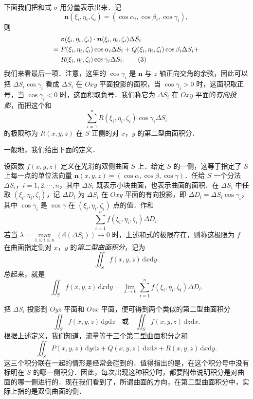 下面我们把和式 $\sigma$ 用分量表示出来．记
\[
\bm{n}(\xi_{i},\eta_{i},\zeta_{i})=\left(\cos\alpha_{i},\cos\beta_{i},\cos\gamma_{i}\right),
\]
则
\begin{align}
&\boldsymbol{v}(\xi_{i},\eta_{i},\zeta_{i})\cdot\boldsymbol{n}(\xi_{i},\eta_{i},\zeta_{i})\Delta S_{i}\notag\\
={}&P(\xi_{i},\eta_{i},\zeta_{i})\cos\alpha_{i}\Delta S_{i}+Q(\xi_{i},\eta_{i},\zeta_{i})\cos\beta_{i}\Delta S_{i}+\notag\\
&R(\xi_{i},\eta_{i},\zeta_{i})\cos\gamma_{i}\Delta S_{i}. \tag{3}\label{eq:21-2-3}
\end{align}
我们来看最后一项．注意，这里的 $\cos\gamma_{i}$ 是 $\bm{n}$ 与 $z$ 轴正向交角的余弦，因此可以把 $\Delta S_{i}\cos\gamma_{i}$ 看成 $\Delta S_{i}$ 在 $Oxy$ 平面投影的面积，当 $\cos\gamma_{i}>0$ 时，这面积取正号，当 $\cos\gamma_{i}<0$ 时，这面积取负号．我们称它为 $\Delta S_{i}$ 在 $Oxy$ 平面的\emph{有向投影}，而把这个和
\[
\sum_{i=1}^{n}R(\xi_{i},\eta_{i},\zeta_{i})\cos\gamma_{i}\Delta S_{i}
\]
的极限称为 $R(x,y,z)$ 在 $S$ 正侧的对 $x$，$y$ 的第二型曲面积分．

一般地，我们给出下面的定义．

\begin{definition}\label{def:21-4}
设函数 $f(x,y,z)$ 定义在光滑的双侧曲面 $S$ 上．给定 $S$ 的一侧，这等于指定了 $S$ 上每一点的单位法向量 $\bm{n}(x,y,z)=(\cos\alpha,\cos\beta,\cos\gamma)$．任给 $S$ 一个分法 $\Delta S_{i}$，$i=1,2,\cdots,n$，其中 $\Delta S_{i}$ 既表示小块曲面，也表示曲面的面积．在 $\Delta S_{i}$ 中任取 $(\xi_{i},\eta_{i},\zeta_{i})$，记 $\Delta D_{i}$ 为 $\Delta S_{i}$ 在 $Oxy$ 平面的有向投影，即 $\Delta D_{i}=\Delta S_{i}\cos\gamma_{i}$，其中 $\cos\gamma_{i}$ 是 $\cos\gamma$ 在 $(\xi_{i},\eta_{i},\zeta_{i})$ 点的值．作和
\[
\sum_{i=1}^{n}f(\xi_{i},\eta_{i},\zeta_{i})\Delta D_{i}.
\]
若当 $\lambda=\max\limits_{1\leqslant i\leqslant n}\left(\mathrm{d}(\Delta S_{i})\right)\to0$ 时，上述和式的极限存在，则称这极限为 $f$ 在曲面指定侧对 $x$，$y$ 的\emph{第二型曲面积分}，记为
\[
\iint_{S}f(x,y,z)\,\mathrm{d}x\mathrm{d}y.
\]
总起来，就是
\[
\iint_{S}f(x,y,z)\,\mathrm{d}x\mathrm{d}y=\lim_{\lambda\to0}\sum_{i=1}^{n}f(\xi_{i},\eta_{i},\zeta_{i})\Delta D_{i}.
\]
\end{definition}

把 $\Delta S_{i}$ 投影到 $Oyz$ 平面和 $Ozx$ 平面，便可得到两个类似的第二型曲面积分
\[
\iint_{S}f(x,y,z)\,\mathrm{d}y\mathrm{d}z\quad\text{或}\quad\iint_{S}f(x,y,z)\,\mathrm{d}z\mathrm{d}x.
\]
根据上述定义，我们知道，流量等于三个第二型曲面积分之和
\[
\iint_{S}P(x,y,z)\,\mathrm{d}y\mathrm{d}z+Q(x,y,z)\,\mathrm{d}z\mathrm{d}x+R(x,y,z)\,\mathrm{d}x\mathrm{d}y.
\]
这三个积分联在一起的情形是经常会碰到的．值得指出的是，在这个积分号中没有标明在 $S$ 的哪一侧积分．因此，每次出现这种积分时，都要附带说明积分是对曲面的哪一侧进行的．现在我们看到了，所谓曲面的方向，在第二型曲面积分中，实际上指的是双侧曲面的侧．

